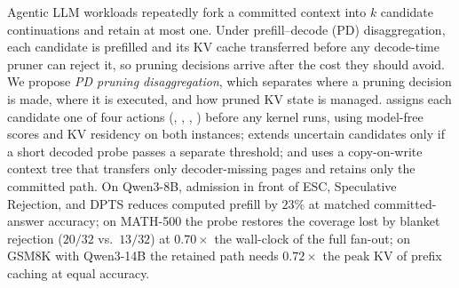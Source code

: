 Agentic LLM workloads repeatedly fork a committed context into $k$ candidate continuations and retain at most one.
Under prefill--decode (PD) disaggregation, each candidate is prefilled and its KV cache transferred before any decode-time pruner can reject it, so pruning decisions arrive after the cost they should avoid.
We propose \emph{PD pruning disaggregation}, which separates where a pruning decision is made, where it is executed, and how pruned KV state is managed.
\sys assigns each candidate one of four actions (\Hit, \Admit, \Probe, \Reject) before any kernel runs, using model-free scores and KV residency on both instances; extends uncertain candidates only if a short decoded probe passes a separate threshold; and uses a copy-on-write context tree that transfers only decoder-missing pages and retains only the committed path.
On Qwen3-8B, admission in front of ESC, Speculative Rejection, and DPTS reduces computed prefill by $23\%$ at matched committed-answer accuracy; on MATH-500 the probe restores the coverage lost by blanket rejection ($20/32$ vs.\ $13/32$) at $0.70\times$ the wall-clock of the full fan-out; on GSM8K with Qwen3-14B the retained path needs $0.72\times$ the peak KV of prefix caching at equal accuracy.